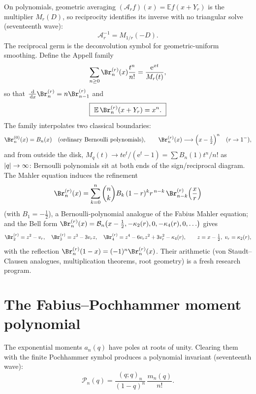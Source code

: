 \documentclass[11pt,oneside]{article}
\numberwithin{equation}{section}
\theoremstyle{definition}
\theoremstyle{remark}
\newcommand{\E}{\mathbb E}
\newcommand{\dd}{\,\mathrm d}
\newcommand{\e}{\mathrm e}
\newcommand{\Bell}{\mathcal B}
\begin{document}
On polynomials, geometric averaging $(\mathcal A_rf)(x)=\E f(x+Y_r)$ is the
multiplier $M_r(D)$, so reciprocity identifies its inverse with no triangular
solve (seventeenth wave):
\begin{equation}\label{p7:eq:averaging-inverse}
 \boxed{\ \mathcal A_r^{-1}=M_{1/r}(-D).\ }
\end{equation}
The reciprocal germ is the deconvolution symbol for geometric-uniform
smoothing.  Define the Appell family
\begin{equation}\label{p7:eq:appell-gen}
 \sum_{n\ge0}\Br_n^{(r)}(x)\frac{t^n}{n!}
 =\frac{\e^{xt}}{M_r(t)},
\end{equation}
so that $\tfrac{\dd}{\dd x}\Br_n^{(r)}=n\Br_{n-1}^{(r)}$ and
\begin{equation}\label{p7:eq:appell-deconvolution}
 \boxed{\ \E\,\Br_n^{(r)}(x+Y_r)=x^n.\ }
\end{equation}
The family interpolates two classical boundaries:
\begin{equation}\label{p7:eq:appell-boundaries}
 \Br_n^{(0)}(x)=B_n(x)
 \quad\text{(ordinary Bernoulli polynomials)},
 \qquad
 \Br_n^{(r)}(x)\longrightarrow\Bigl(x-\tfrac12\Bigr)^{n}
 \quad(r\to1^-),
\end{equation}
and from outside the disk,
$M_q(t)\to t\e^t/(\e^t-1)=\sum B_n(1)t^n/n!$ as $\left\lvert q\right\rvert\to\infty$: Bernoulli
polynomials sit at both ends of the sign/reciprocal diagram.  The Mahler
equation induces the refinement
\begin{equation}\label{p7:eq:appell-mahler}
 \Br_n^{(r)}(x)=
 \sum_{k=0}^{n}\binom nk B_k\,(1-r)^kr^{\,n-k}\,
 \Br_{n-k}^{(r)}\!\left(\frac xr\right)
\end{equation}
(with $B_1=-\tfrac12$), a Bernoulli-polynomial analogue of the Fabius Mahler
equation; and the Bell form
$\Br_n^{(r)}(x)=\Bell_n\bigl(x-\tfrac12,-\kappa_2(r),0,-\kappa_4(r),0,
\ldots\bigr)$ gives
\[
 \Br_2^{(r)}=z^2-v_r,\quad
 \Br_3^{(r)}=z^3-3v_rz,\quad
 \Br_4^{(r)}=z^4-6v_rz^2+3v_r^2-\kappa_4(r),
 \qquad z=x-\tfrac12,\ v_r=\kappa_2(r),
\]
with the reflection $\Br_n^{(r)}(1-x)=(-1)^n\Br_n^{(r)}(x)$.  Their
arithmetic (von Staudt--Clausen analogues, multiplication theorems, root
geometry) is a fresh research program.

\section{The Fabius--Pochhammer moment polynomial}
\label{p7:sec:moment-polynomial}

The exponential moments $a_n(q)$ have poles at roots of unity.  Clearing them
with the finite Pochhammer symbol produces a polynomial invariant
(seventeenth wave):
\begin{equation}\label{p7:eq:Pn-def}
 \boxed{\ \mathcal P_n(q)=\frac{(q;q)_n}{(1-q)^n}\,\frac{m_n(q)}{n!}.\ }
\end{equation}
\end{document}
